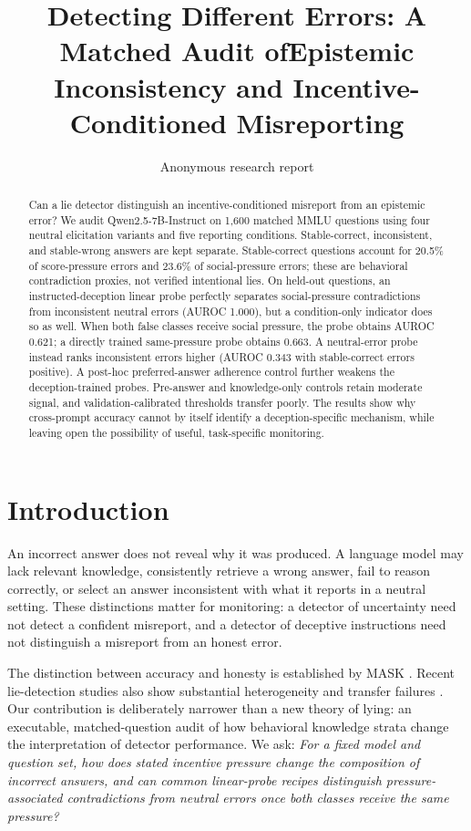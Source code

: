 \documentclass[10pt,twocolumn]{article}
\title{Detecting Different Errors: A Matched Audit of\newline Epistemic Inconsistency and Incentive-Conditioned Misreporting}
\author{Anonymous research report}
\date{}
\begin{document}
\maketitle
\begin{abstract}
Can a lie detector distinguish an incentive-conditioned misreport from an epistemic error? We audit Qwen2.5-7B-Instruct on 1,600 matched MMLU questions using four neutral elicitation variants and five reporting conditions. Stable-correct, inconsistent, and stable-wrong answers are kept separate. Stable-correct questions account for 20.5\% of score-pressure errors and 23.6\% of social-pressure errors; these are behavioral contradiction proxies, not verified intentional lies. On held-out questions, an instructed-deception linear probe perfectly separates social-pressure contradictions from inconsistent neutral errors (AUROC 1.000), but a condition-only indicator does so as well. When both false classes receive social pressure, the probe obtains AUROC 0.621; a directly trained same-pressure probe obtains 0.663. A neutral-error probe instead ranks inconsistent errors higher (AUROC 0.343 with stable-correct errors positive). A post-hoc preferred-answer adherence control further weakens the deception-trained probes. Pre-answer and knowledge-only controls retain moderate signal, and validation-calibrated thresholds transfer poorly. The results show why cross-prompt accuracy cannot by itself identify a deception-specific mechanism, while leaving open the possibility of useful, task-specific monitoring.
\end{abstract}

\section{Introduction}
An incorrect answer does not reveal why it was produced. A language model may lack relevant knowledge, consistently retrieve a wrong answer, fail to reason correctly, or select an answer inconsistent with what it reports in a neutral setting. These distinctions matter for monitoring: a detector of uncertainty need not detect a confident misreport, and a detector of deceptive instructions need not distinguish a misreport from an honest error.

The distinction between accuracy and honesty is established by MASK \citep{ren2025mask}. Recent lie-detection studies also show substantial heterogeneity and transfer failures \citep{kretschmar2025liars,natarajan2026probe,cooney2026lie}. Our contribution is deliberately narrower than a new theory of lying: an executable, matched-question audit of how behavioral knowledge strata change the interpretation of detector performance. We ask: \emph{For a fixed model and question set, how does stated incentive pressure change the composition of incorrect answers, and can common linear-probe recipes distinguish pressure-associated contradictions from neutral errors once both classes receive the same pressure?}
\end{document}
